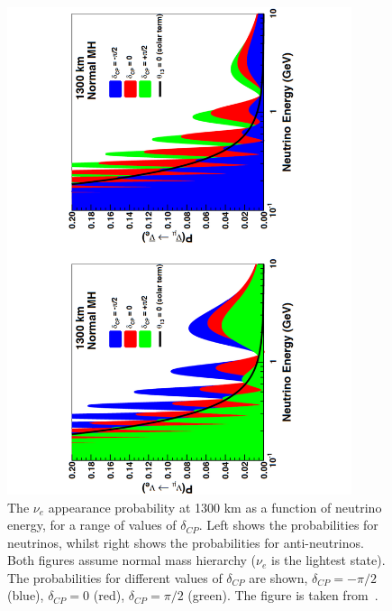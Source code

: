 \begin{figure}
  \centering 
  \includegraphics[width=0.9\textwidth]{DUNEOscillProb}
  \caption[The $\nu_e$ appearance probability at 1300 km as a function of neutrino energy, for a range of values of $\delta_{CP}$]
          {The $\nu_e$ appearance probability at 1300 km as a function of neutrino energy, for a range of values of $\delta_{CP}$. Left shows the probabilities for neutrinos, whilst right shows the probabilities for anti-neutrinos. Both figures assume normal mass hierarchy ($\nu_e$ is the lightest state). The probabilities for different values of $\delta_{CP}$ are shown, $\delta_{CP} = -\pi/2$ (blue), $\delta_{CP} = 0$ (red), $\delta_{CP} = \pi/2$ (green). The figure is taken from~\citep{DUNECDR_V2}.}
  \label{fig:DUNEOscillProb}
\end{figure}

